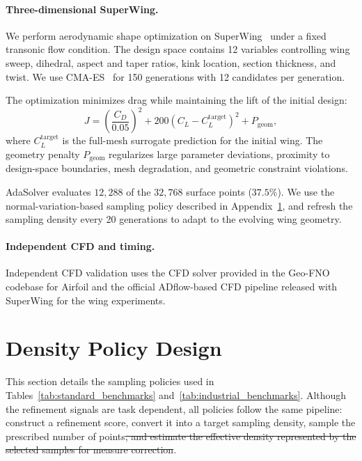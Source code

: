 \documentclass{article}
\providecommand{\DIFaddtex}[1]{{\protect\color{blue}\uwave{#1}}} %
\providecommand{\DIFdeltex}[1]{{\protect\color{red}\sout{#1}}}                      %
\providecommand{\DIFaddbegin}{} %
\providecommand{\DIFaddend}{} %
\providecommand{\DIFdelbegin}{} %
\providecommand{\DIFdelend}{} %
\providecommand{\DIFadd}[1]{\texorpdfstring{\DIFaddtex{#1}}{#1}} %
\providecommand{\DIFdel}[1]{\texorpdfstring{\DIFdeltex{#1}}{}} %
\newcommand{\DIFscaledelfig}{0.5}
\newlength{\DIFdelgraphicswidth} %
\newlength{\DIFdelgraphicsheight} %
\newcommand{\DIFaddincludegraphics}[2][]{{\color{blue}\fbox{\DIFOincludegraphics[#1]{#2}}}} %
\newcommand{\DIFdelincludegraphics}[2][]{%
\sbox{\DIFdelgraphicsbox}{\DIFOincludegraphics[#1]{#2}}%
\settoboxwidth{\DIFdelgraphicswidth}{\DIFdelgraphicsbox} %
\settoboxtotalheight{\DIFdelgraphicsheight}{\DIFdelgraphicsbox} %
\scalebox{\DIFscaledelfig}{%
\parbox[b]{\DIFdelgraphicswidth}{\usebox{\DIFdelgraphicsbox}\\[-\baselineskip] \rule{\DIFdelgraphicswidth}{0em}}\llap{\resizebox{\DIFdelgraphicswidth}{\DIFdelgraphicsheight}{%
\setlength{\unitlength}{\DIFdelgraphicswidth}%
\begin{picture}(1,1)%
\thicklines\linethickness{2pt} %
{\color[rgb]{1,0,0}\put(0,0){\framebox(1,1){}}}%
{\color[rgb]{1,0,0}\put(0,0){\line( 1,1){1}}}%
{\color[rgb]{1,0,0}\put(0,1){\line(1,-1){1}}}%
\end{picture}%
}\hspace*{3pt}}} %
} %
\DeclareRobustCommand{\DIFaddbegin}{\DIFOaddbegin \let\includegraphics\DIFaddincludegraphics} %
\DeclareRobustCommand{\DIFaddend}{\DIFOaddend \let\includegraphics\DIFOincludegraphics} %
\DeclareRobustCommand{\DIFdelbegin}{\DIFOdelbegin \let\includegraphics\DIFdelincludegraphics} %
\DeclareRobustCommand{\DIFdelend}{\DIFOaddend \let\includegraphics\DIFOincludegraphics} %
\renewcommand{\DIFaddincludegraphics}[2][]{%
  \begingroup
  \sbox{\DIFdelgraphicsbox}{\DIFOincludegraphics[#1]{#2}}%
  \setlength{\fboxsep}{0pt}\setlength{\fboxrule}{0.8pt}%
  {\color{blue}\fbox{\resizebox{\dimexpr\wd\DIFdelgraphicsbox-2\fboxrule\relax}{!}{\usebox{\DIFdelgraphicsbox}}}}%
  \endgroup
}
\begin{document}
\paragraph{Three-dimensional SuperWing.}
We perform aerodynamic shape optimization on SuperWing~\citep{yang2025superwing}
under a fixed transonic flow condition. The design space contains 12 variables
controlling wing sweep, dihedral, aspect and taper ratios, kink location,
section thickness, and twist. We use CMA-ES~\citep{hansen2001completely} for
150 generations with 12 candidates per generation.

The optimization minimizes drag while maintaining the lift of the initial design:
\begin{equation}
    J=\left(\frac{C_D}{0.05}\right)^2
      +200\left(C_L-C_L^{\mathrm{target}}\right)^2
      +P_{\mathrm{geom}},
    \label{eq:app_wing_design_objective}
\end{equation}
where $C_L^{\mathrm{target}}$ is the full-mesh surrogate prediction for the
initial wing. The geometry penalty $P_{\mathrm{geom}}$ regularizes large
parameter deviations, proximity to design-space boundaries, mesh degradation,
and geometric constraint violations.

AdaSolver evaluates $12{,}288$ of the $32{,}768$ surface points ($37.5\%$).
We use the normal-variation-based sampling policy described in
Appendix~\ref{app:density_policy_design}, and refresh the sampling density every 20 generations to
adapt to the evolving wing geometry.



\paragraph{Independent CFD and timing.}

Independent CFD validation uses the CFD solver provided in the Geo-FNO \citep{li2023geofno} codebase for Airfoil and the official ADflow-based CFD pipeline released with SuperWing \citep{yang2025superwing} for the wing experiments.


\clearpage
\section{Density Policy Design}
\label{app:density_policy_design}

This section details the sampling policies used in
Tables~\ref{tab:standard_benchmarks} and~\ref{tab:industrial_benchmarks}.
Although the refinement signals are task dependent, all policies follow the
same pipeline: construct a refinement score, convert it into a target sampling
density, \DIFaddbegin \DIFadd{and }\DIFaddend sample the prescribed number of points\DIFdelbegin \DIFdel{, and estimate the effective
density represented by the selected samples for measure correction}\DIFdelend .
\end{document}
